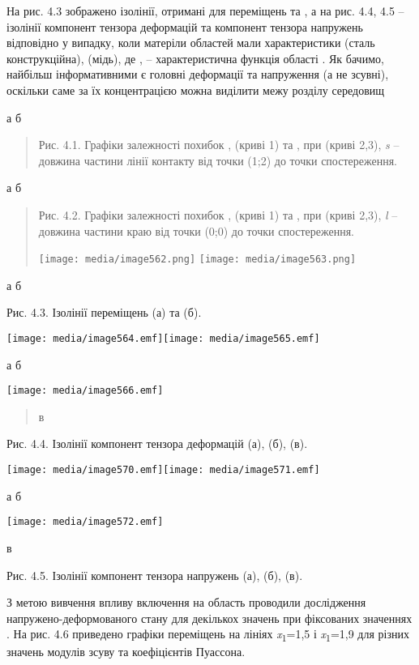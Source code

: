 На рис. 4.3 зображено ізолінії, отримані для переміщень та , а на рис.
4.4, 4.5 -- ізолінії компонент тензора деформацій та компонент тензора
напружень відповідно у випадку, коли матеріли областей мали
характеристики (сталь конструкційна), (мідь), де , -- характеристична
функція області . Як бачимо, найбільш інформативними є головні
деформації та напруження (а не зсувні), оскільки саме за їх
концентрацією можна виділити межу розділу середовищ

а б

\begin{quote}
Рис. 4.1. Графіки залежності похибок , (криві 1) та , при (криві 2,3),
\emph{s} -- довжина частини лінії контакту від точки (1;2) до точки
спосте­реження.
\end{quote}

а б

\begin{quote}
Рис. 4.2. Графіки залежності похибок , (криві 1) та , при (криві 2,3),
\emph{l} -- довжина частини краю від точки (0;0) до точки
спосте­реження.

\texttt{[image: media/image562.png]}
\texttt{[image: media/image563.png]}
\end{quote}

а б

Рис. 4.3. Ізолінії переміщень (а) та (б).

\texttt{[image: media/image564.emf]}\texttt{[image: media/image565.emf]}

а б

\texttt{[image: media/image566.emf]}

\begin{quote}
в
\end{quote}

Рис. 4.4. Ізолінії компонент тензора деформацій (а), (б), (в).

\texttt{[image: media/image570.emf]}\texttt{[image: media/image571.emf]}

а б

\texttt{[image: media/image572.emf]}

в

Рис. 4.5. Ізолінії компонент тензора напружень (а), (б), (в).

З метою вивчення впливу включення на область проводили дослідження
напружено-деформованого стану для декількох значень при фіксованих
значеннях . На рис. 4.6 приведено графіки переміщень на лініях
\emph{x}\textsubscript{1}=1,5 і \emph{x}\textsubscript{1}=1,9 для різних
значень модулів зсуву та коефіцієн­тів Пуассона.

